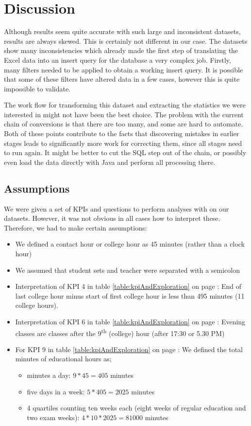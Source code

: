 \section{Discussion}
Although results seem quite accurate with such large and inconsistent datasets, results are always skewed. This is certainly not different in our case. The datasets show many inconsistencies which already made the first step of translating the Excel data into an insert query for the database a very complex job. Firstly, many filters needed to be applied to obtain a working insert query. It is possible that some of these filters have altered data in a few cases, however this is quite impossible to validate.

The work flow for transforming this dataset and extracting the statistics we were interested in might not have been the best choice. The problem with the current chain of conversions is that there are too many, and some are hard to automate. Both of these points contribute to the facts that discovering mistakes in earlier stages leads to significantly more work for correcting them, since all stages need to run again. It might be better to cut the SQL step out of the chain, or possibly even load the data directly with Java and perform all processing there.

\subsection{Assumptions}
We were given a set of KPIs and questions to perform analyses with on our datasets. However, it was not obvious in all cases how to interpret these. Therefore, we had to make certain assumptions:
\begin{itemize}
	\item We defined a contact hour or college hour as 45 minutes (rather than a clock hour)
	\item We assumed that student sets and teacher were separated with a semicolon
	\item Interpretation of KPI 4 in table \ref{table:kpiAndExploration} on page \pageref{table:kpiAndExploration}: End of last college hour minus start of first college hour is less than 495 minutes (11 college hours).
	\item Interpretation of KPI 6 in table \ref{table:kpiAndExploration} on page \pageref{table:kpiAndExploration}: Evening classes are classes after the 9\textsuperscript{th} (college) hour (after 17:30 or 5.30 PM)
	\item For KPI 9 in table \ref{table:kpiAndExploration} on page \pageref{table:kpiAndExploration}: We defined the total minutes of educational hours as;
	\begin{itemize} 
	\item minutes a day: $9*45=405$ minutes
	\item five days in a week: $5*405=2025$ minutes
	\item 4 quartiles counting ten weeks each (eight weeks of regular education and two exam weeks): $4*10*2025=81000$ minutes
	\end{itemize}
\end{itemize}

